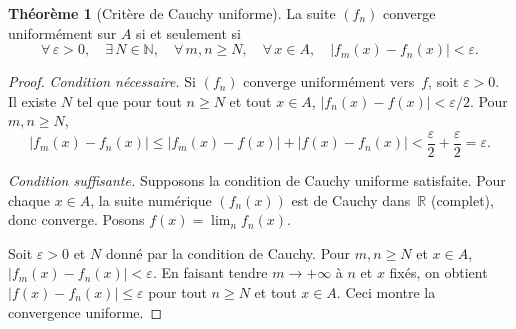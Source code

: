 \documentclass[12pt,a4paper,openany]{book}
\theoremstyle{definition}
\newtheorem{theoreme}{Théorème}[chapter]
\newcommand{\N}{\mathbb{N}}
\newcommand{\R}{\mathbb{R}}
\newcommand{\eps}{\varepsilon}
\newcommand{\abs}[1]{\left\lvert #1 \right\rvert}
\begin{document}
\begin{center}
\end{center}

\begin{theoreme}[Critère de Cauchy uniforme]\label{thm:cauchy-uniforme}
  La suite $(f_n)$ converge uniformément sur $A$ si et seulement si
  \[
    \forall\, \eps > 0, \quad \exists\, N \in \N, \quad \forall\, m, n \geqslant N, \quad \forall\, x \in A, \quad \abs{f_m(x) - f_n(x)} < \eps.
  \]
\end{theoreme}

\begin{proof}
  \emph{Condition nécessaire.} Si $(f_n)$ converge uniformément vers~$f$, soit $\eps > 0$. Il existe $N$ tel que pour tout $n \geqslant N$ et tout $x \in A$, $\abs{f_n(x) - f(x)} < \eps/2$. Pour $m, n \geqslant N$,
  \[
    \abs{f_m(x) - f_n(x)} \leqslant \abs{f_m(x) - f(x)} + \abs{f(x) - f_n(x)} < \frac{\eps}{2} + \frac{\eps}{2} = \eps.
  \]

  \emph{Condition suffisante.} Supposons la condition de Cauchy uniforme satisfaite. Pour chaque $x \in A$, la suite numérique $(f_n(x))$ est de Cauchy dans~$\R$ (complet), donc converge. Posons $f(x) = \lim_{n} f_n(x)$.

  Soit $\eps > 0$ et $N$ donné par la condition de Cauchy. Pour $m, n \geqslant N$ et $x \in A$, $\abs{f_m(x) - f_n(x)} < \eps$. En faisant tendre $m \to +\infty$ à $n$ et $x$ fixés, on obtient $\abs{f(x) - f_n(x)} \leqslant \eps$ pour tout $n \geqslant N$ et tout $x \in A$. Ceci montre la convergence uniforme.
\end{proof}
\end{document}
